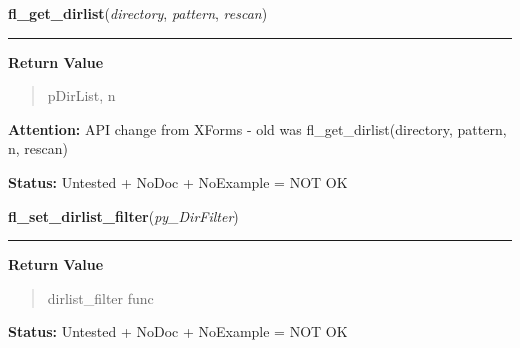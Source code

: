     \label{xformslib:library:fl_get_dirlist}

    \vspace{0.5ex}

\hspace{.8\funcindent}\begin{boxedminipage}{\funcwidth}

    \raggedright \textbf{fl\_get\_dirlist}(\textit{directory}, \textit{pattern}, \textit{rescan})

    \vspace{-1.5ex}

    \rule{\textwidth}{0.5\fboxrule}
\setlength{\parskip}{2ex}
\setlength{\parskip}{1ex}
      \textbf{Return Value}
    \vspace{-1ex}

      \begin{quote}
      pDirList, n

      \end{quote}

\textbf{Attention:} API change from XForms - old was fl\_get\_dirlist(directory, pattern, n, 
rescan)



\textbf{Status:} Untested + NoDoc + NoExample = NOT OK



    \end{boxedminipage}

    \label{xformslib:library:fl_set_dirlist_filter}

    \vspace{0.5ex}

\hspace{.8\funcindent}\begin{boxedminipage}{\funcwidth}

    \raggedright \textbf{fl\_set\_dirlist\_filter}(\textit{py\_DirFilter})

    \vspace{-1.5ex}

    \rule{\textwidth}{0.5\fboxrule}
\setlength{\parskip}{2ex}
\setlength{\parskip}{1ex}
      \textbf{Return Value}
    \vspace{-1ex}

      \begin{quote}
      dirlist\_filter func

      \end{quote}

\textbf{Status:} Untested + NoDoc + NoExample = NOT OK



    \end{boxedminipage}

